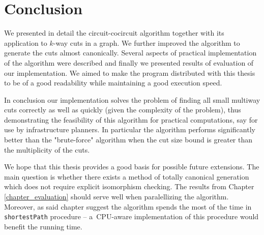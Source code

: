 
\chapter{Conclusion}

We presented in detail the circuit-cocircuit algorithm together with its application to $k$-way cuts in a graph. We further improved the algorithm to generate the cuts almost canonically. Several aspects of practical implementation of the algorithm were described and finally we presented results of evaluation of our implementation. We aimed to make the program distributed with this thesis to be of a good readability while maintaining a good execution speed.

In conclusion our implementation solves the problem of finding all small multiway cuts correctly as well as quickly (given the complexity of the problem), thus demonstrating the feasibility of this algorithm for practical computations, say for use by infrastructure planners. In particular the algorithm performs significantly better than the "brute-force" algorithm when the cut size bound is greater than the multiplicity of the cuts.

We hope that this thesis provides a good basis for possible future extensions. The main question is whether there exists a method of totally canonical generation which does not require explicit isomorphism checking. The results from Chapter \ref{chapter_evaluation} should serve well when paralellizing the algorithm. Moreover, as said chapter suggest the algorithm spends the most of the time in \lstinline|shortestPath| procedure -- a~CPU-aware implementation \cite{parallel_bfs} of this procedure would benefit the running time.
